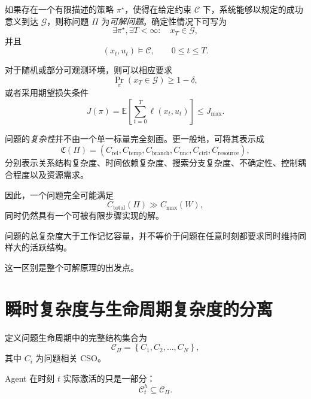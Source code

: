 如果存在一个有限描述的策略 $\pi^\star$，使得在给定约束 $\mathcal C$ 下，系统能够以规定的成功意义到达 $\mathcal G$，则称问题 $\Pi$ 为\emph{可解问题}。确定性情况下可写为
\begin{equation}
\exists \pi^\star,\exists T<\infty:
\quad
x_T\in\mathcal G,
\end{equation}
并且
\begin{equation}
(x_t,u_t)\models\mathcal C,
\qquad
0\leq t\leq T.
\end{equation}

对于随机或部分可观测环境，则可以相应要求
\begin{equation}
\Pr_\pi(x_T\in\mathcal G)
\geq
1-\delta,
\end{equation}
或者采用期望损失条件
\begin{equation}
J(\pi)
=
\mathbb E
\left[
\sum_{t=0}^{T}
\ell(x_t,u_t)
\right]
\leq
J_{\max}.
\end{equation}

问题的\emph{复杂性}并不由一个单一标量完全刻画。更一般地，可将其表示成
\begin{equation}
\mathfrak C(\Pi)
=
\left(
C_{\mathrm{rel}},
C_{\mathrm{temp}},
C_{\mathrm{branch}},
C_{\mathrm{unc}},
C_{\mathrm{ctrl}},
C_{\mathrm{resource}}
\right),
\end{equation}
分别表示关系结构复杂度、时间依赖复杂度、搜索分支复杂度、不确定性、控制耦合程度以及资源需求。

因此，一个问题完全可能满足
\begin{equation}
C_{\mathrm{total}}(\Pi)
\gg
C_{\max}(W),
\end{equation}
同时仍然具有一个可被有限步骤实现的解。

问题的总复杂度大于工作记忆容量，并不等价于问题在任意时刻都要求同时维持同样大的活跃结构。

这一区别是整个可解原理的出发点。

\section{瞬时复杂度与生命周期复杂度的分离}

定义问题生命周期中的完整结构集合为
\begin{equation}
\mathcal C_\Pi
=
\left\{
C_1,
C_2,
\ldots,
C_N
\right\},
\end{equation}
其中 $C_i$ 为问题相关 CSO。

Agent 在时刻 $t$ 实际激活的只是一部分：
\begin{equation}
\mathcal C_t^{h}
\subseteq
\mathcal C_\Pi.
\end{equation}

